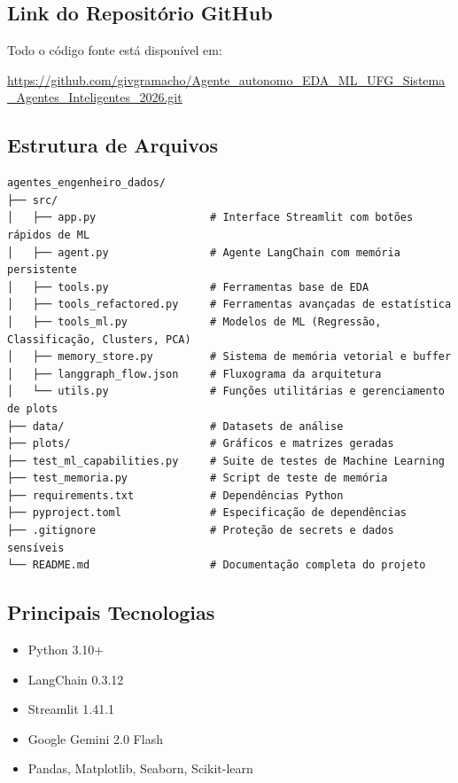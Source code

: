 \documentclass[12pt,a4paper]{article}
\begin{document}
\subsection{Link do Repositório GitHub}

Todo o código fonte está disponível em:

\begin{center}
\url{https://github.com/givgramacho/Agente_autonomo_EDA_ML_UFG_Sistema_Agentes_Inteligentes_2026.git}
\end{center}

\subsection{Estrutura de Arquivos}

\begin{verbatim}
agentes_engenheiro_dados/
├── src/
│   ├── app.py                  # Interface Streamlit com botões rápidos de ML
│   ├── agent.py                # Agente LangChain com memória persistente
│   ├── tools.py                # Ferramentas base de EDA
│   ├── tools_refactored.py     # Ferramentas avançadas de estatística
│   ├── tools_ml.py             # Modelos de ML (Regressão, Classificação, Clusters, PCA)
│   ├── memory_store.py         # Sistema de memória vetorial e buffer
│   ├── langgraph_flow.json     # Fluxograma da arquitetura
│   └── utils.py                # Funções utilitárias e gerenciamento de plots
├── data/                       # Datasets de análise
├── plots/                      # Gráficos e matrizes geradas
├── test_ml_capabilities.py     # Suite de testes de Machine Learning
├── test_memoria.py             # Script de teste de memória
├── requirements.txt            # Dependências Python
├── pyproject.toml              # Especificação de dependências
├── .gitignore                  # Proteção de secrets e dados sensíveis
└── README.md                   # Documentação completa do projeto
\end{verbatim}

\subsection{Principais Tecnologias}

\begin{itemize}
    \item Python 3.10+
    \item LangChain 0.3.12
    \item Streamlit 1.41.1
    \item Google Gemini 2.0 Flash
    \item Pandas, Matplotlib, Seaborn, Scikit-learn
\end{itemize}
\end{document}
